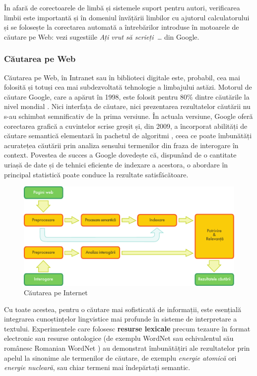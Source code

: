 \begin{multicols}{2}
În afară de corectoarele de limbă și sistemele suport pentru autori, verificarea limbii este importantă și în domeniul învățării limbilor cu ajutorul calculatorului și se folosește la corectarea automată a întrebărilor introduse în motoarele de căutare pe Web: vezi sugestiile \textit{Ați vrut să scrieți~\dots} din Google.

\subsubsection{Căutarea pe Web}

Căutarea pe Web, în Intranet sau în biblioteci digitale este, probabil, cea mai folosită și totuși cea mai subdezvoltată tehnologie a limbajului astăzi. Motorul de căutare Google, care a apărut în 1998, este folosit pentru 80\% dintre căutările la nivel mondial \cite{spi1}. Nici interfața de căutare, nici prezentarea rezultatelor căutării nu s-au schimbat semnificativ de la prima versiune. În actuala versiune, Google oferă corectarea grafică a cuvintelor scrise greșit și, din 2009, a încorporat abilități de căutare semantică elementară în pachetul de algoritmi \cite{pc1}, ceea ce poate îmbunătăți acuratețea căutării prin analiza sensului termenilor din fraza de interogare în context. Povestea de succes a Google dovedește că, dispunând de o cantitate uriașă de date și de tehnici eficiente de indexare a acestora, o abordare în principal statistică poate conduce la rezultate satisfăcătoare.

\begin{figure}[htb]
\center
\includegraphics[width=\textwidth]{../_media/romanian/web_search_architecture}
\caption{Căutarea pe Internet}
\label{fig:websearcharch_de}
\end{figure}

Cu toate acestea, pentru o căutare mai sofisticată de informații, este esențială integrarea cunoștințelor lingvistice mai profunde în sisteme de interpretare a textului. Experimentele care folosesc \textbf{resurse lexicale} precum tezaure în format electronic sau resurse ontologice (de exemplu WordNet sau echivalentul său românesc Romanian WordNet \cite{WN} ) au demonstrat îmbunătățiri ale rezultatelor prin apelul la sinonime ale termenilor de căutare, de exemplu \textit{energie atomică} ori \textit{energie nucleară}, sau chiar termeni mai îndepărtați semantic.


\end{multicols}
